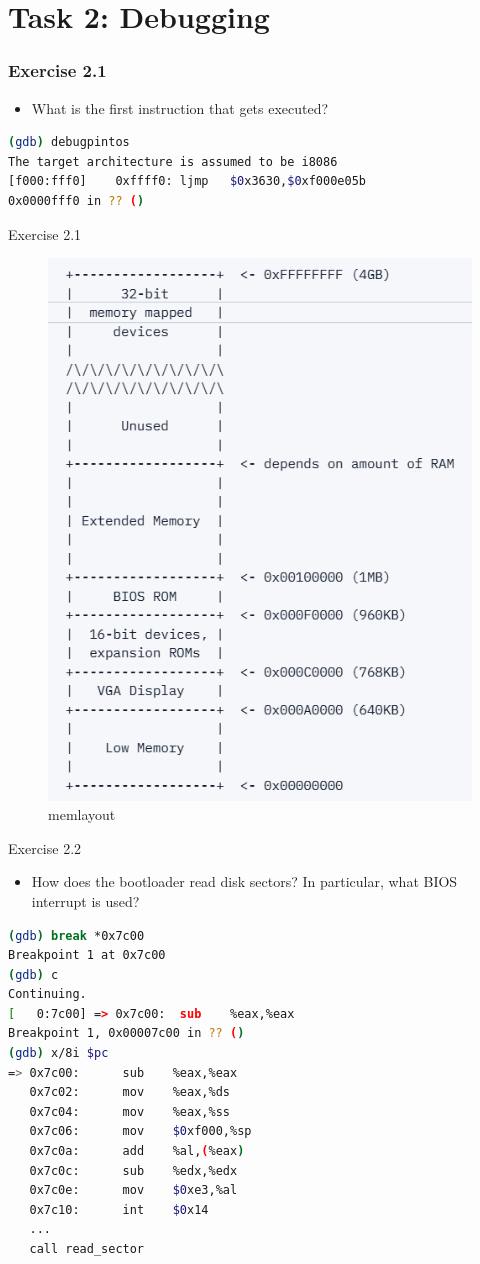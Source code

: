 \documentclass[14pt]{beamer}
\begin{document}
\section{Task 2: Debugging}
\begin{frame}[fragile]
    \frametitle{Exercise 2.1}
    \begin{itemize}
        \item What is the first instruction that gets executed?
    \end{itemize}
    \begin{block}{}
        \begin{lstlisting}[language=bash]
(gdb) debugpintos
The target architecture is assumed to be i8086
[f000:fff0]    0xffff0: ljmp   $0x3630,$0xf000e05b
0x0000fff0 in ?? ()
        \end{lstlisting}
    \end{block}
\end{frame}
\begin{frame}{Exercise 2.1}
\begin{figure}
    \centering
    \includegraphics[width=0.5\linewidth]{figure/memlayout.png}
    \caption{memlayout}
\end{figure}
\end{frame}
\begin{frame}[fragile]{Exercise 2.2}
\begin{itemize}
    \item How does the bootloader read disk sectors? In particular, what BIOS interrupt is used?
\end{itemize}
    \begin{block}{}
        \begin{lstlisting}[language=bash]
(gdb) break *0x7c00 
Breakpoint 1 at 0x7c00
(gdb) c
Continuing.
[   0:7c00] => 0x7c00:  sub    %eax,%eax
Breakpoint 1, 0x00007c00 in ?? ()
(gdb) x/8i $pc
=> 0x7c00:      sub    %eax,%eax
   0x7c02:      mov    %eax,%ds
   0x7c04:      mov    %eax,%ss
   0x7c06:      mov    $0xf000,%sp
   0x7c0a:      add    %al,(%eax)
   0x7c0c:      sub    %edx,%edx
   0x7c0e:      mov    $0xe3,%al
   0x7c10:      int    $0x14
   ...
   call read_sector
        \end{lstlisting}
    \end{block}
\end{frame}
\end{document}
